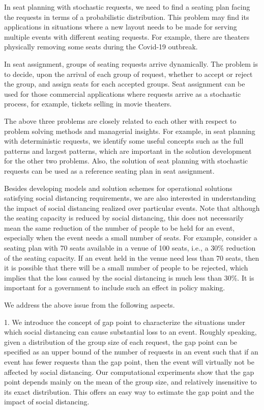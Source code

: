 In seat planning with stochastic requests, we need to find a seating plan facing the requests in terms of a probabilistic distribution. This problem may find its applications in situations where a new layout needs to be made for serving multiple events with different seating requests. For example, there are theaters physically removing some seats during the Covid-19 outbreak. \cite{Berlin_theater}

In seat assignment, groups of seating requests arrive dynamically. The problem is to decide, upon the arrival of each group of request, whether to accept or reject the group, and assign seats for each accepted groups. Seat assignment can be used for those commercial applications where requests arrive as a stochastic process, for example, tickets selling in movie theaters.

The above three problems are closely related to each other with respect to problem solving methods and managerial insights. For example, in seat planning with deterministic requests,
we identify some useful concepts such as the full patterns and largest patterns, which are important in the solution development for the other two problems. Also, the solution of seat planning with stochastic requests can be used  as a reference seating plan in seat assignment.


Besides developing models and solution schemes for operational solutions satisfying  social distancing requirements, we are also interested in understanding the impact of social  distancing realized over  particular events. Note that although the seating capacity  is reduced by social distancing, this does not necessarily mean the same reduction of the number of people to be held for an event, especially when the event  needs a small number of seats. For example, consider a seating plan with 70 seats available in a venue of 100 seats, i.e., a 30\% reduction of the seating capacity. If an event held in the venue need less than 70 seats, then it is possible that there will be a small number of people to be rejected, which implies that the loss caused by the social distancing is much less than 30\%. It is important for a government to include such an effect in policy making.

We address the above issue from the following aspects.


1. We introduce the concept of gap point to characterize the situations under which social distancing can cause substantial loss to an event. Roughly speaking, given a distribution of the group size of each request, the gap point can be specified as an upper bound of the number of requests in an event such that if an event has fewer requests than the gap point, then the event will virtually not be affected by social distancing. Our computational experiments show that the gap point depends mainly on the mean of the group size, and relatively insensitive to its exact distribution. This offers an easy way to estimate the gap point and the impact of social distancing.

